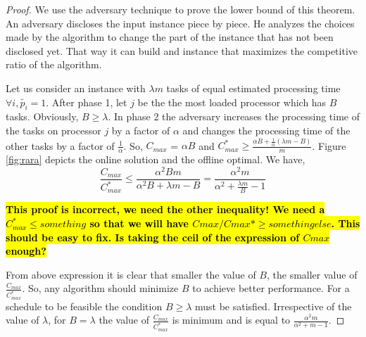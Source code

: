 \documentclass[10pt, conference, compsocconf]{IEEEtran}
\newcommand{\todo}[1]{{\color{red}\textbf{\hl{#1}}\xspace}}
\begin{document}
\begin{proof}
  We use the adversary technique to prove the lower bound of this
  theorem. An adversary discloses the input instance piece by
  piece. He analyzes the choices made by the algorithm to change the
  part of the instance that has not been disclosed yet. That way it
  can build and instance that maximizes the competitive ratio of the
  algorithm.
 
  Let us consider an instance with $\lambda m$ tasks of equal estimated processing time
  $\forall i, \tilde{p_i} = 1$. After phase 1, let $j$ be the the most loaded
  processor which has $B$ tasks. Obviously, $B \geq \lambda$. In phase
  2 the adversary increases the processing time of the tasks on
  processor $j$ by a factor of $\alpha$ and changes the processing
  time of the other tasks by a factor of $\frac{1}{\alpha}$. So, $
  C_{max}$ = $\alpha B$ and ${C^{*}_{max}} \geq \frac{\alpha B +
    \frac{1}{\alpha } (\lambda m - B) }{m}$.  Figure \ref{fig:rara}
  depicts the online solution and the offline optimal. We have,
 \begin{equation}\nonumber
   \frac{C_{max}}{C^{*}_{max}}
   \leq \frac{\alpha^{2} B m }{\alpha^{2} B + \lambda m - B}
   =\frac{\alpha^{2}  m }{\alpha^{2}  + \frac{\lambda m}{B}  - 1}
 \end{equation}

 \todo{This proof is incorrect, we need the other inequality! We need
   a $C_{max}^* \leq something$ so that we will have $Cmax/Cmax* \geq
   somethingelse$. This should be easy to fix. Is taking the ceil of
   the expression of $Cmax$ enough?}
 
 From above expression it is clear that smaller the value of $B$, the
 smaller value of $\frac{C_{max}}{C^{*}_{max}}$. So, any algorithm
 should minimize $B$ to achieve  better performance.  For a schedule
 to be feasible the condition $B \geq \lambda$ must be
 satisfied. Irrespective of the value of $\lambda$, for $B =
 \lambda$ the value of $\frac{C_{max}}{C^{*}_{max}}$ is minimum and is
 equal to $\frac{\alpha^{2}m }{\alpha^{2} + m-1}$.


\end{proof}
\end{document}
